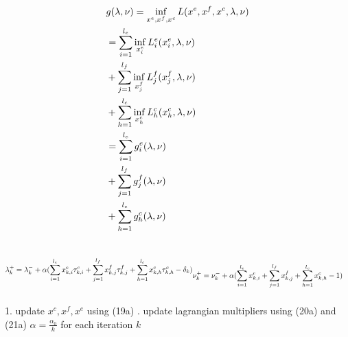 \documentclass[conference]{IEEEtran}
\begin{document}
    \begin{subequations}
      \begin{align}
        &g(\lambda, \nu) = \inf_{x^e,x^f,x^c}L(x^e,x^f,x^c,\lambda,\nu) \\ \notag
        &=\sum_{i=1}^{l_e}\inf_{x_i^e}L_{i}^e(x_{i}^e,\lambda,\nu) \\ \notag
        &+\sum_{j=1}^{l_f}\inf_{x_j^f}L_{j}^f(x_{j}^f,\lambda,\nu) \\ \notag
        &+\sum_{h=1}^{l_c}\inf_{x_h^c}L_{h}^c(x_{h}^c,\lambda,\nu) \\ \notag
        &=\sum_{i=1}^{l_e}g_{i}^e(\lambda,\nu) \\ \notag
        &+\sum_{j=1}^{l_f}g_{j}^f(\lambda,\nu) \\ \notag
        &+\sum_{h=1}^{l_c}g_{h}^c(\lambda,\nu) \\ \notag
      \end{align}
    \end{subequations}

    \begin{subequations}
      \begin{align}
        &\lambda_k^+ = \lambda_k^- + \alpha(\sum_{i=1}^{l_e}x_{k,i}^e\tau_{k,i}^e
        +\sum_{j=1}^{l_f}x_{k,j}^f\tau_{k,j}^f
        +\sum_{h=1}^{l_c}x_{k,h}^c\tau_{k,h}^c
        -\delta_k) \\ \notag
      \end{align}
      \begin{align}
        &\nu_k^+ = \nu_k^- + \alpha(\sum_{i=1}^{l_e}x_{k,i}^e+\sum_{j=1}^{l_f}x_{k,j}^f+\sum_{h=1}^{l_c}x_{k,h}^c-1)
      \end{align}
    \end{subequations}

    \begin{algorithm}
      \caption{}
      \begin{algorithmic}
        1. update $x^c, x^f, x^e$ using (19a) . update lagrangian multipliers using (20a) and (21a) \newline
        $\alpha = \frac{\alpha_0}{k}$ for each iteration $k$
        \ENDWHILE
      \end{algorithmic}
    \end{algorithm}
\end{document}
